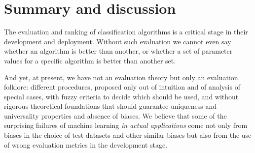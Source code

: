 \documentclass[\ifafour a4paper,12pt,\else a5paper,10pt,\fi%
onecolumn,oneside,article,%
british%
]{memoir}
\theoremstyle{remark}
\theoremstyle{innote}
\renewcommand*{\|}[1][]{\nonscript\:#1\vert\nonscript\:\mathopen{}}
\newcommand*{\eg}{{e.g.}}
\begin{document}
%




\section{Summary and discussion}
\label{sec:discussion}

The evaluation and ranking of classification algorithms is a critical stage in their development and deployment. Without such evaluation we cannot even say whether an algorithm is better than another, or whether a set of parameter values for a specific algorithm is better than another set.

And yet, at present, we have not an evaluation theory but only an evaluation folklore: different procedures, proposed only out of intuition and of analysis of special cases, with fuzzy criteria to decide which should be used, and without rigorous theoretical foundations that should guarantee uniqueness and universality properties and absence of biases. We believe that some of the surprising failures of machine learning \emph{in actual applications}\autocites[see \eg][]{varoquauxetal2022} come not only from biases in the choice of test datasets and other similar biases but also from the use of wrong evaluation metrics in the development stage.
\end{document}
